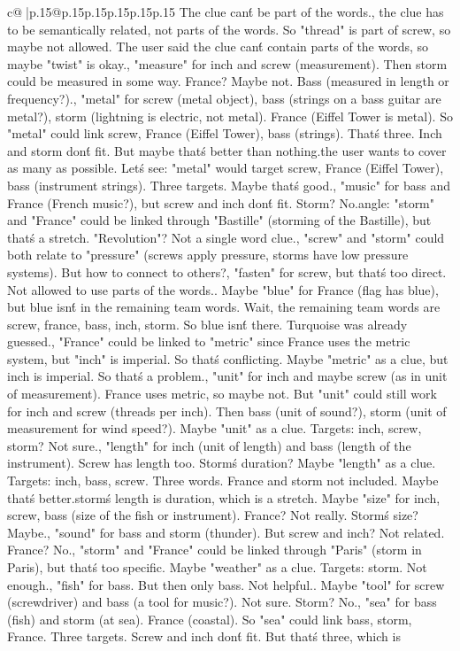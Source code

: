 \documentclass{article}
\begin{document}
{\begin{supertabular}{c@{$\;$}|p{.15\linewidth}@{}p{.15\linewidth}p{.15\linewidth}p{.15\linewidth}p{.15\linewidth}p{.15\linewidth}}
{{{The clue can\'t be part of the words.\n\nWait, the clue has to be semantically related, not parts of the words. So "thread" is part of screw, so maybe not allowed. The user said the clue can\'t contain parts of the words, so maybe "twist" is okay.\n\nAlternatively, "measure" for inch and screw (measurement). Then storm could be measured in some way. France? Maybe not. Bass (measured in length or frequency?).\n\nAlternatively, "metal" for screw (metal object), bass (strings on a bass guitar are metal?), storm (lightning is electric, not metal). France (Eiffel Tower is metal). So "metal" could link screw, France (Eiffel Tower), bass (strings). That\'s three. Inch and storm don\'t fit. But maybe that\'s better than nothing.\n\nBut the user wants to cover as many as possible. Let\'s see: "metal" would target screw, France (Eiffel Tower), bass (instrument strings). Three targets. Maybe that\'s good.\n\nAlternatively, "music" for bass and France (French music?), but screw and inch don\'t fit. Storm? No.\n\nAnother angle: "storm" and "France" could be linked through "Bastille" (storming of the Bastille), but that\'s a stretch. "Revolution"? Not a single word clue.\n\nWait, "screw" and "storm" could both relate to "pressure" (screws apply pressure, storms have low pressure systems). But how to connect to others?\n\nAlternatively, "fasten" for screw, but that\'s too direct. Not allowed to use parts of the words.\n\nHmm. Maybe "blue" for France (flag has blue), but blue isn\'t in the remaining team words. Wait, the remaining team words are screw, france, bass, inch, storm. So blue isn\'t there. Turquoise was already guessed.\n\nWait, "France" could be linked to "metric" since France uses the metric system, but "inch" is imperial. So that\'s conflicting. Maybe "metric" as a clue, but inch is imperial. So that\'s a problem.\n\nAlternatively, "unit" for inch and maybe screw (as in unit of measurement). France uses metric, so maybe not. But "unit" could still work for inch and screw (threads per inch). Then bass (unit of sound?), storm (unit of measurement for wind speed?). Maybe "unit" as a clue. Targets: inch, screw, storm? Not sure.\n\nAlternatively, "length" for inch (unit of length) and bass (length of the instrument). Screw has length too. Storm\'s duration? Maybe "length" as a clue. Targets: inch, bass, screw. Three words. France and storm not included. Maybe that\'s better.\n\nBut storm\'s length is duration, which is a stretch. Maybe "size" for inch, screw, bass (size of the fish or instrument). France? Not really. Storm\'s size? Maybe.\n\nAlternatively, "sound" for bass and storm (thunder). But screw and inch? Not related. France? No.\n\nWait, "storm" and "France" could be linked through "Paris" (storm in Paris), but that\'s too specific. Maybe "weather" as a clue. Targets: storm. Not enough.\n\nAlternatively, "fish" for bass. But then only bass. Not helpful.\n\nHmm. Maybe "tool" for screw (screwdriver) and bass (a tool for music?). Not sure. Storm? No.\n\nAlternatively, "sea" for bass (fish) and storm (at sea). France (coastal). So "sea" could link bass, storm, France. Three targets. Screw and inch don\'t fit. But that\'s three, which is }}}
\end{supertabular}}
\end{document}
